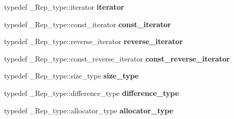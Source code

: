 \begin{DoxyCompactItemize}
\item 
\mbox{\label{classmap_a7f4de37673de1a7dd284404437126182}} 
typedef \+\_\+\+Rep\+\_\+type\+::iterator {\bfseries iterator}
\item 
\mbox{\label{classmap_af09ea4a8b3a439c3424bb241442e35f5}} 
typedef \+\_\+\+Rep\+\_\+type\+::const\+\_\+iterator {\bfseries const\+\_\+iterator}
\item 
\mbox{\label{classmap_a27a409b8840113db3cd959c6c212c452}} 
typedef \+\_\+\+Rep\+\_\+type\+::reverse\+\_\+iterator {\bfseries reverse\+\_\+iterator}
\item 
\mbox{\label{classmap_ab273f28162144675bdffae51c54d9b55}} 
typedef \+\_\+\+Rep\+\_\+type\+::const\+\_\+reverse\+\_\+iterator {\bfseries const\+\_\+reverse\+\_\+iterator}
\item 
\mbox{\label{classmap_a6b0a5294e9041bb1b8e34f0206646a7b}} 
typedef \+\_\+\+Rep\+\_\+type\+::size\+\_\+type {\bfseries size\+\_\+type}
\item 
\mbox{\label{classmap_af75962ec85735f99996b361b8b8cd1b0}} 
typedef \+\_\+\+Rep\+\_\+type\+::difference\+\_\+type {\bfseries difference\+\_\+type}
\item 
\mbox{\label{classmap_a421b9413f83cbd9fbeeed32c74cc82ab}} 
typedef \+\_\+\+Rep\+\_\+type\+::allocator\+\_\+type {\bfseries allocator\+\_\+type}
\end{DoxyCompactItemize}
